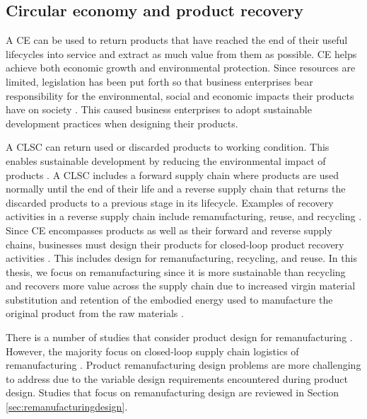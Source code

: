 \subsection{Circular economy and product recovery} \label{subsec:CE}

A \ac{CE} can be used to return products that have reached the end of their useful lifecycles into service and extract as much value from them as possible. \ac{CE} helps achieve both economic growth and environmental protection. Since resources are limited, legislation has been put forth so that business enterprises bear responsibility for the environmental, social and economic impacts their products have on society \cite{Matos2007}. This caused business enterprises to adopt sustainable development practices when designing their products.

A \ac{CLSC} can return used or discarded products to working condition. This enables sustainable development by reducing the environmental impact of products \cite{QuariguasiFrotaNeto2010}. A \ac{CLSC} includes a forward supply chain where products are used normally until the end of their life and a reverse supply chain that returns the discarded products to a previous stage in its lifecycle. Examples of recovery activities in a reverse supply chain include remanufacturing, reuse, and recycling \cite{Lieder2016,MacArthur2013a}. Since \ac{CE} encompasses products as well as their forward and reverse supply chains, businesses must design their products for closed-loop product recovery activities \cite{Lieder2016}. This includes design for remanufacturing, recycling, and reuse. In this thesis, we focus on remanufacturing since it is more sustainable than recycling and recovers more value across the supply chain due to increased virgin material substitution and retention of the embodied energy used to manufacture the original product from the raw materials \cite{MacArthur2013a,Goodall2014}. 

There is a number of studies that consider product design for remanufacturing \cite{Ijomah2010,Liu2017}. However, the majority focus on closed-loop supply chain logistics of remanufacturing \cite{Mahadevan,Golinska2015,VanThao2015,Song2005,Koren2018}. Product remanufacturing design problems are more challenging to address due to the variable design requirements encountered during product design. Studies that focus on remanufacturing design are reviewed in Section \ref{sec:remanufacturingdesign}. 

